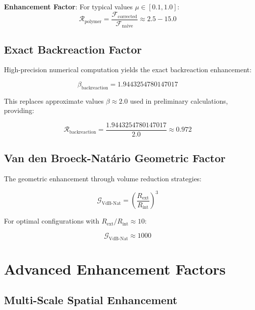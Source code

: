 \documentclass[12pt,a4paper]{article}
\begin{document}
\textbf{Enhancement Factor}: For typical values $\mu \in [0.1, 1.0]$:
\begin{equation}
\mathcal{R}_{\text{polymer}} = \frac{\mathcal{F}_{\text{corrected}}}{\mathcal{F}_{\text{naive}}} \approx 2.5 - 15.0
\end{equation}

\subsection{Exact Backreaction Factor}

High-precision numerical computation yields the exact backreaction enhancement:

\begin{equation}
\beta_{\text{backreaction}} = 1.9443254780147017
\end{equation}

This replaces approximate values $\beta \approx 2.0$ used in preliminary calculations, providing:

\begin{equation}
\mathcal{R}_{\text{backreaction}} = \frac{1.9443254780147017}{2.0} \approx 0.972
\end{equation}

\subsection{Van den Broeck-Natário Geometric Factor}

The geometric enhancement through volume reduction strategies:

\begin{equation}
\mathcal{G}_{\text{VdB-Nat}} = \left(\frac{R_{\text{ext}}}{R_{\text{int}}}\right)^3
\end{equation}

For optimal configurations with $R_{\text{ext}}/R_{\text{int}} \approx 10$:

\begin{equation}
\mathcal{G}_{\text{VdB-Nat}} \approx 1000
\end{equation}

\section{Advanced Enhancement Factors}

\subsection{Multi-Scale Spatial Enhancement}
\end{document}
